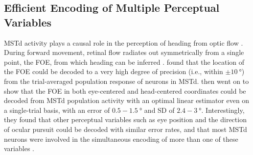 
\subsection{Efficient Encoding of Multiple Perceptual Variables}
\label{sec:MSTd|results|perceptual}
\ac{MSTd} activity plays a causal role in the perception of heading from 
optic flow \citep{Gu2010,Gu2012}. During forward movement, retinal flow 
radiates out symmetrically from a single point, the \ac{FOE}, from which
heading can be inferred \citep{Gibson1950}. \cite{PageDuffy1999} found that
the location of the \ac{FOE} could be decoded to a very high degree of 
precision (i.e., within $\pm \SI{10}{\degree}$) from the trial-averaged 
population response of neurons in \ac{MSTd}. \cite{BenHamed2003} then went
on to show that the \ac{FOE} in both eye-centered and head-centered 
coordinates could be decoded from \ac{MSTd} population activity with an 
optimal linear estimator even on a single-trial basis, with an error of 
$0.5-\SI{1.5}{\degree}$ and SD of $2.4-\SI{3}{\degree}$. Interestingly, 
they found that other perceptual variables such as eye position and the 
direction of ocular pursuit could be decoded with similar error rates, and 
that most \ac{MSTd} neurons were involved in the simultaneous encoding of 
more than one of these variables \citep{BenHamed2003}.

